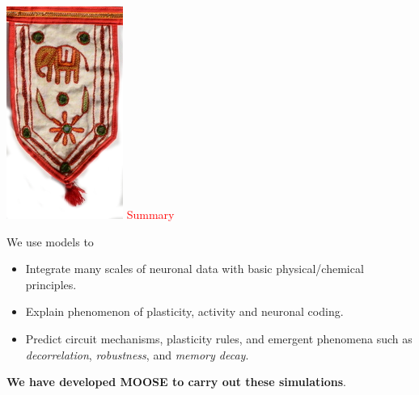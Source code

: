 \documentclass[a0paper,12pt]{article}
\newenvironment{Figure}
  {\par\medskip\noindent\minipage{\linewidth}}
  {\endminipage\par\medskip}
\newcommand{\HEADING}[1]
{
    \includegraphics[scale=0.35]{./images/heading.png}
    \fontsize{2.5cm}{1cm}\selectfont \textcolor{red}{#1}
    \vspace{1cm}
}
\begin{document}
\begin{multicols}{3}
\begin{Figure}
    \HEADING{Summary}

    \HUGE We use models to
    \begin{itemize}
            
        \item Integrate many scales of neuronal data with basic
            physical/chemical principles.
        \item Explain phenomenon of plasticity, activity and neuronal coding.
        \item Predict circuit mechanisms, plasticity rules, and emergent
            phenomena such as \emph{decorrelation}, \emph{robustness}, and
            \emph{memory decay}.

    \end{itemize}

    \textbf{We have developed MOOSE to carry out these simulations}.

\end{Figure}

\end{multicols}
\end{document}
